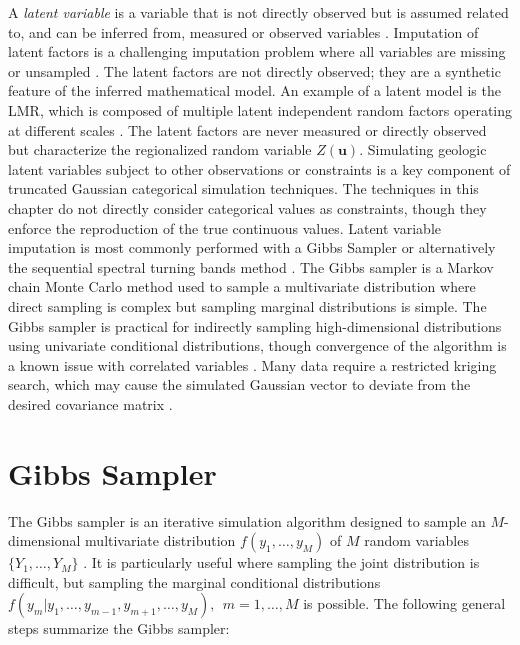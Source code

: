 A \textit{latent variable} is a variable that is not directly observed but is assumed related to, and can be inferred from, measured or observed variables \citep{everitt2010cambridge}. Imputation of latent factors is a challenging imputation problem where all variables are missing or unsampled \citep{little2019statistical}. The latent factors are not directly observed; they are a synthetic feature of the inferred mathematical model. An example of a latent model is the \gls{LMR}, which is composed of multiple latent independent random factors operating at different scales \citep{goovaerts1992factorial}. The latent factors are never measured or directly observed but characterize the regionalized random variable $Z(\mathbf{u})$. Simulating geologic latent variables subject to other observations or constraints is a key component of truncated Gaussian categorical simulation techniques. The techniques in this chapter do not directly consider categorical values as constraints, though they enforce the reproduction of the true continuous values. Latent variable imputation is most commonly performed with a Gibbs Sampler \citep{emery2014simulating,silva2017multiple,arroyo2020iterative,madani2021enhanced} or alternatively the sequential spectral turning bands method \citep{lauzon2020calibration,lauzon2020sequential,lauzon2023joint}. The Gibbs sampler is a Markov chain Monte Carlo method used to sample a multivariate distribution where direct sampling is complex but sampling marginal distributions is simple. The Gibbs sampler is practical for indirectly sampling high-dimensional distributions using univariate conditional distributions, though convergence of the algorithm is a known issue with correlated variables \citep{silva2018enhanced}. Many data require a restricted kriging search, which may cause the simulated Gaussian vector to deviate from the desired covariance matrix \citep{emery2014simulating}.


\FloatBarrier
\section{Gibbs Sampler}
\label{sec:05gibbs}

The Gibbs sampler \citep{geman1984stochastic} is an iterative simulation algorithm designed to sample an $M$-dimensional multivariate distribution $f(y_{1}, \dots, y_{M})$ of $M$ random variables $\{Y_{1}, \dots, Y_{M}\}$ \citep{little2019statistical}. It is particularly useful where sampling the joint distribution is difficult, but sampling the marginal conditional distributions $f(y_{m}|y_{1},\dots,y_{m-1},y_{m+1},\dots,y_{M}), \ \ m=1,\dots,M$ is possible. The following general steps summarize the Gibbs sampler:

